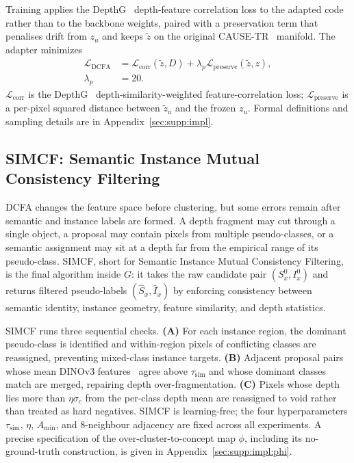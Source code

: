 \documentclass{article}
\newcounter{algorithm}
\begin{document}
Training applies the DepthG~\cite{sick2024depthg} depth-feature correlation loss to the adapted code rather than to the backbone weights, paired with a preservation term that penalises drift from $z_u$ and keeps $\tilde z$ on the original CAUSE-TR~\cite{kim2024cause} manifold. The adapter minimizes
\begin{equation}
\begin{aligned}
\mathcal{L}_\text{DCFA}
&= \mathcal{L}_\text{corr}(\tilde z, D)
 + \lambda_p \mathcal{L}_\text{preserve}(\tilde z, z), \\
\lambda_p &= 20 .
\end{aligned}
\label{eq:dcfa_loss}
\end{equation}
$\mathcal{L}_\text{corr}$ is the DepthG~\cite{sick2024depthg} depth-similarity-weighted feature-correlation loss; $\mathcal{L}_\text{preserve}$ is a per-pixel squared distance between $\tilde z_u$ and the frozen $z_u$. Formal definitions and sampling details are in Appendix~\ref{sec:supp:impl}.
\subsection{SIMCF: Semantic Instance Mutual Consistency Filtering}
\label{sec:method:simcf}

DCFA changes the feature space before clustering, but some errors remain after semantic and instance labels are formed. A depth fragment may cut through a single object, a proposal may contain pixels from multiple pseudo-classes, or a semantic assignment may sit at a depth far from the empirical range of its pseudo-class. SIMCF, short for Semantic Instance Mutual Consistency Filtering, is the final algorithm inside $G$: it takes the raw candidate pair $(S_x^0, I_x^0)$ and returns filtered pseudo-labels $(\hat S_x, \hat I_x)$ by enforcing consistency between semantic identity, instance geometry, feature similarity, and depth statistics.

SIMCF runs three sequential checks. \textbf{(A)} For each instance region, the dominant pseudo-class is identified and within-region pixels of conflicting classes are reassigned, preventing mixed-class instance targets. \textbf{(B)} Adjacent proposal pairs whose mean DINOv3 features~\cite{simeoni2025dinov3} agree above $\tau_\text{sim}$ and whose dominant classes match are merged, repairing depth over-fragmentation. \textbf{(C)} Pixels whose depth lies more than $\eta\sigma_c$ from the per-class depth mean are reassigned to void rather than treated as hard negatives. SIMCF is learning-free; the four hyperparameters $\tau_\text{sim}$, $\eta$, $A_\text{min}$, and 8-neighbour adjacency are fixed across all experiments. A precise specification of the over-cluster-to-concept map $\phi$, including its no-ground-truth construction, is given in Appendix~\ref{sec:supp:impl:phi}.
\end{document}

